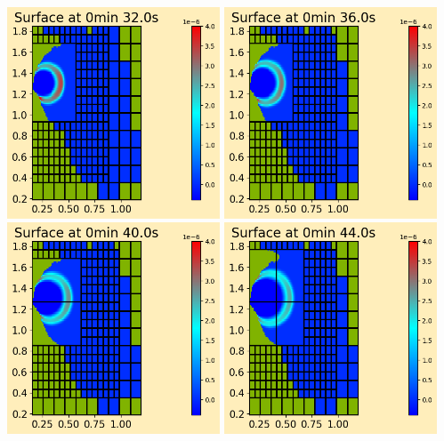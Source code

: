 \documentclass[11pt]{article}
\begin{document}
\vskip 10pt 
\includegraphics[width=0.475\textwidth]{frame0008fig0.png}
\vskip 10pt 
\includegraphics[width=0.475\textwidth]{frame0009fig0.png}
\vskip 10pt 
\includegraphics[width=0.475\textwidth]{frame0010fig0.png}
\vskip 10pt 
\includegraphics[width=0.475\textwidth]{frame0011fig0.png}
\end{document}
